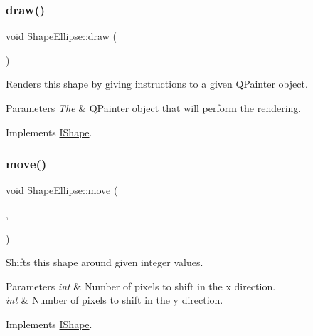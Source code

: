 \subsubsection{\texorpdfstring{draw()}{draw()}}
{\footnotesize\ttfamily void Shape\+Ellipse\+::draw (\begin{DoxyParamCaption}\item[{Q\+Painter \&}]{ }\end{DoxyParamCaption})\hspace{0.3cm}{\ttfamily [virtual]}}



Renders this shape by giving instructions to a given Q\+Painter object. 


\begin{DoxyParams}{Parameters}
{\em The} & Q\+Painter object that will perform the rendering. \\
\hline
\end{DoxyParams}


Implements \mbox{\hyperlink{class_i_shape_ad97c626e7e2c9afb9f51efc41b836e6f}{I\+Shape}}.

\mbox{\label{class_shape_ellipse_a07ce6783744d01ccebbd5c2c8b4c7d9b}} 
\subsubsection{\texorpdfstring{move()}{move()}}
{\footnotesize\ttfamily void Shape\+Ellipse\+::move (\begin{DoxyParamCaption}\item[{int}]{,  }\item[{int}]{ }\end{DoxyParamCaption})\hspace{0.3cm}{\ttfamily [virtual]}}



Shifts this shape around given integer values. 


\begin{DoxyParams}{Parameters}
{\em int} & Number of pixels to shift in the x direction. \\
\hline
{\em int} & Number of pixels to shift in the y direction. \\
\hline
\end{DoxyParams}


Implements \mbox{\hyperlink{class_i_shape_a3d23494cd34e658cc6b39a2e2db0b7fe}{I\+Shape}}.

